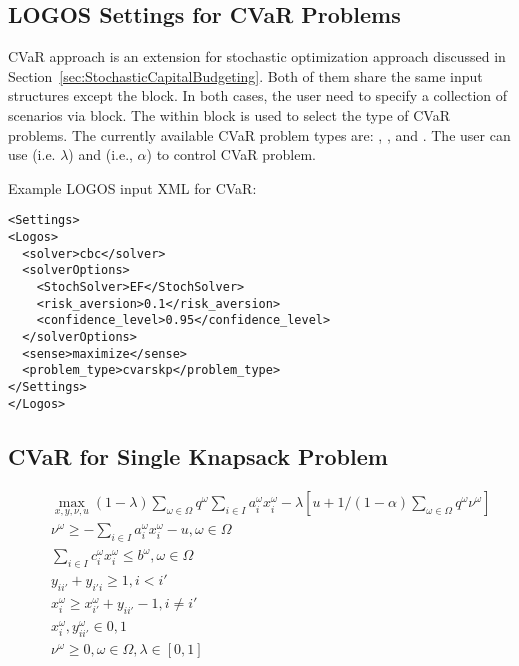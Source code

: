 \subsection{LOGOS Settings for CVaR Problems}
\label{subsec:CVaRSettings}
CVaR approach is an extension for stochastic optimization approach discussed in
Section~\ref{sec:StochasticCapitalBudgeting}. Both of them share the same input
structures except the  block. In both cases, the user need to
specify a collection of scenarios via  block. The
 within  block is used to select the
type of CVaR problems. The currently available CVaR problem types are:
, , and . The user can
use  (i.e. $\lambda$) and 
(i.e., $\alpha$) to control CVaR problem.

Example LOGOS input XML for CVaR:
\begin{lstlisting}[style=XML]
<Settings>
<Logos>
  <solver>cbc</solver>
  <solverOptions>
    <StochSolver>EF</StochSolver>
    <risk_aversion>0.1</risk_aversion>
    <confidence_level>0.95</confidence_level>
  </solverOptions>
  <sense>maximize</sense>
  <problem_type>cvarskp</problem_type>
</Settings>
</Logos>
\end{lstlisting}


\subsection{CVaR for Single Knapsack Problem}
\label{subsec:CVaR_SKP}

\vst {}
\begin{subequations}\label{CVaRSimpleKP}
\begin{eqnarray}
& & \max_{x, y, \nu, u} (1-\lambda)  \sum _{ \omega  \in  \Omega }^{}q^{ \omega } \sum _{i \in I}^{} a_{i}^{ \omega }x_{i}^{ \omega } - \lambda[u+1/(1-\alpha)\sum_{\omega \in \Omega} q^\omega \nu^\omega] \\
& & \nu^\omega \ge - \sum _{i \in I}^{} a_{i}^{ \omega }x_{i}^{ \omega } - u, \omega \in \Omega \\
& & \sum_{i \in I} c_{i}^\omega x_{i}^\omega \leq b^\omega, \omega \in \Omega\\
& & y_{ii'} + y_{i'i} \geq 1, i<i'  \\
& & x_{i}^\omega \geq x_{i'}^\omega + y_{ii'}-1, i\neq i' \\
& & x_{i}^\omega, y_{ii'}^\omega \in {0, 1} \\
& & \nu^\omega \ge 0, \omega \in \Omega, \lambda \in [0, 1]
\end{eqnarray}
\end{subequations}

